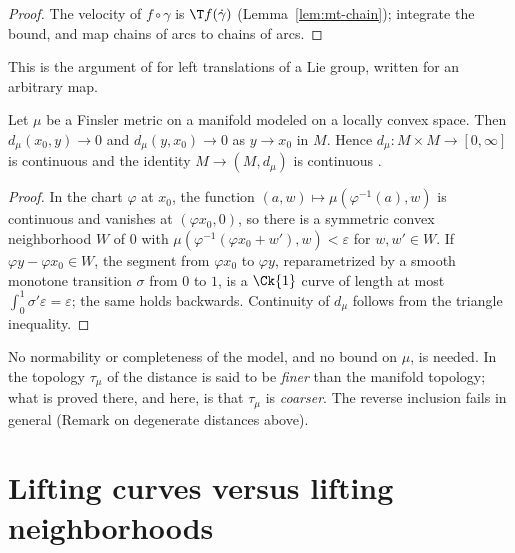 \begin{proof}
  \leanok
  The velocity of $f \circ \gamma$ is $\T f(\dot\gamma)$ (Lemma~\ref{lem:mt-chain}); integrate
  the bound, and map chains of arcs to chains of arcs.
\end{proof}

This is the argument of \cite[Prop.~2.10(3)]{Lar19} for left translations of a Lie group,
written for an arbitrary map.

\begin{theorem}
  \label{thm:mt-dist-continuous}
  \leanok
  Let $\mu$ be a Finsler metric on a manifold modeled on a locally convex space. Then
  $d_\mu(x_0, y) \to 0$ and $d_\mu(y, x_0) \to 0$ as $y \to x_0$ in $M$. Hence
  $d_\mu\colon M \times M \to [0, \infty]$ is continuous and the identity $M \to (M, d_\mu)$ is
  continuous \cite[Prop.~2.10(1), (2)]{Lar19}.
\end{theorem}

\begin{proof}
  \leanok
  In the chart $\varphi$ at $x_0$, the function $(a, w) \mapsto \mu(\varphi^{-1}(a), w)$ is
  continuous and vanishes at $(\varphi x_0, 0)$, so there is a symmetric convex neighborhood $W$
  of $0$ with $\mu(\varphi^{-1}(\varphi x_0 + w'), w) < \varepsilon$ for $w, w' \in W$. If
  $\varphi y - \varphi x_0 \in W$, the segment from $\varphi x_0$ to $\varphi y$, reparametrized by
  a smooth monotone transition $\sigma$ from $0$ to $1$, is a $\Ck{1}$ curve of length at most
  $\int_0^1 \sigma' \varepsilon = \varepsilon$; the same holds backwards. Continuity of $d_\mu$
  follows from the triangle inequality.
\end{proof}

No normability or completeness of the model, and no bound on $\mu$, is needed. In
\cite[Prop.~2.10(2)]{Lar19} the topology $\tau_\mu$ of the distance is said to be \emph{finer}
than the manifold topology; what is proved there, and here, is that $\tau_\mu$ is
\emph{coarser}. The reverse inclusion fails in general (Remark on degenerate distances above).

\section{Lifting curves versus lifting neighborhoods}
\label{sec:mt-quotients}

